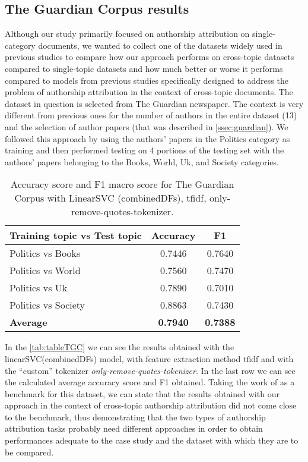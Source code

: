 \subsection{The Guardian Corpus results}
Although our study primarily focused on authorship attribution on single-category documents, we wanted to collect one of the datasets widely used in previous studies to compare how our approach performs on cross-topic datasets compared to single-topic datasets and how much better or worse it performs compared to models from previous studies specifically designed to address the problem of authorship attribution in the context of cross-topic documents.
The dataset in question is selected from The Guardian newspaper. The context is very different from previous ones for the number of authors in the entire dataset (13) and the selection of author papers (that was described in \autoref{ssec:guardian}).
We followed this approach by using the authors' papers in the Politics category as training and then performed testing on 4 portions of the testing set with the authors' papers belonging to the Books, World, Uk, and Society categories.

\begin{table}[h!]
	\begin{center}  
		\caption[The Guardian Corpus Results]{Accuracy score and F1 macro score for The Guardian Corpus with LinearSVC (combinedDFs), tfidf, only-remove-quotes-tokenizer.} 
		\label{tab:tableTGC}
		\begin{tabular}{| p{5 cm} | c | c |}
			\hline 
			Training topic vs Test topic & Accuracy & F1 \\
			\hline
			Politics vs Books & 0.7446 & 0.7640 \\ \hline
			Politics vs World & 0.7560 & 0.7470 \\ \hline
			Politics vs Uk & 0.7890 & 0.7010 \\ \hline
			Politics vs Society & 0.8863 & 0.7430 \\ \hline
			\textbf{Average} & \textbf{0.7940} & \textbf{0.7388} \\ \hline
		\end{tabular} 
	\end{center}
\end{table}

In the \autoref{tab:tableTGC} we can see the results obtained with the linearSVC(combinedDFs) model, with feature extraction method tfidf and with the \enquote{custom} tokenizer \textit{only-remove-quotes-tokenizer}.
In the last row we can see the calculated average accuracy score and F1 obtained.
Taking the work of \cite{posadas2017application} as a benchmark for this dataset, we can state that the results obtained with our approach in the context of cross-topic authorship attribution did not come close to the benchmark, thus demonstrating that the two types of authorship attribution tasks probably need different approaches in order to obtain performances adequate to the case study and the dataset with which they are to be compared.\\

